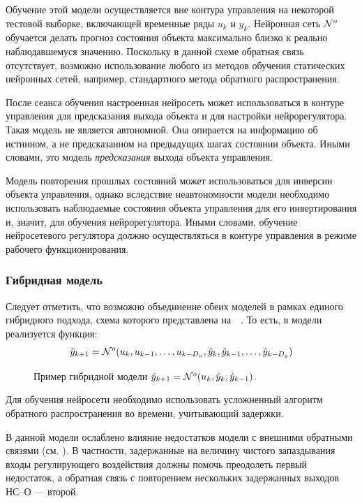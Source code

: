 Обучение этой модели осуществляется вне контура управления на
некоторой тестовой выборке, включающей временные ряды $u_k$ и $y_k$.
Нейронная сеть $\mathcal{N}^o$ обучается делать прогноз состояния
объекта максимально близко к реально наблюдавшемуся значению.
Поскольку в данной схеме обратная связь отсутствует, возможно
использование любого из методов обучения статических нейронных сетей,
например, стандартного метода обратного распространения.

После сеанса обучения настроенная нейросеть может использоваться в
контуре управления для предсказания выхода объекта и для настройки
нейрорегулятора.  Такая модель не является автономной.  Она опирается
на информацию об истинном, а не предсказанном на предыдущих шагах
состоянии объекта.  Иными словами, это модель {\it предсказания
}выхода объекта управления.

Модель повторения прошлых состояний может использоваться для инверсии
объекта управления, однако вследствие неавтономности модели необходимо
использовать наблюдаемые состояния объекта управления для его
инвертирования и, значит, для обучения нейрорегулятора.  Иными
словами, обучение нейросетевого регулятора должно осуществляться в
контуре управления в режиме рабочего функционирования.

\subsubsection{Гибридная модель}

Следует отметить, что возможно объединение обеих моделей в рамках
единого гибридного подхода, схема которого представлена
на~~\cite{park96}.  То есть, в модели
реализуется функция:
\begin{equation}\label{eq:nnp-hybrid}
  \hat{y}_{k+1}=\NN^o(u_k, u_{k-1},\ldots,u_{k-D_u}, \hat{y}_k,
                              \hat{y}_{k-1},\ldots, \hat{y}_{k-D_y})
\end{equation}

\begin{figure}[h]
  \centering
  
  \caption{Пример гибридной модели
  $\hat{y}_{k+1}=\mathcal{N}^o(u_k, \hat{y}_k, \hat{y}_{k-1})$.}
  \label{fig:nnp-hybrid}
\end{figure}

Для обучения нейросети необходимо использовать усложненный алгоритм
обратного распространения во времени, учитывающий задержки.

В данной модели ослаблено влияние недостатков модели с внешними
обратными связями (см. ).  В частности,
задержанные на величину чистого запаздывания входы регулирующего
воздействия должны помочь преодолеть первый недостаток, а обратная
связь с повторением нескольких задержанных выходов НС--О --- второй.

